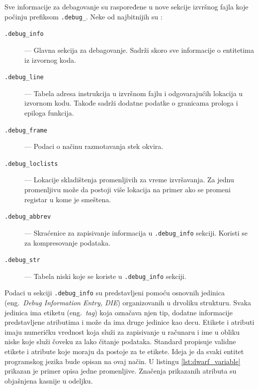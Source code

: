 \documentclass[12pt,oneside]{memoir}
\begin{document}
Sve informacije za debagovanje su raspoređene u nove sekcije izvršnog fajla koje počinju prefiksom \verb|.debug_|.
Neke od najbitnijih su \cite{eager2012introduction_dwarf}:
\begin{description}
  \item[\texttt{.debug\_info}] --- Glavna sekcija za debagovanje. Sadrži skoro sve informacije o entitetima iz izvornog koda.
  \item[\texttt{.debug\_line}] --- Tabela adresa instrukcija u izvršnom fajlu i odgovarajućih lokacija u izvornom kodu. Takođe sadrži dodatne podatke o granicama prologa i epiloga funkcija.
  \item[\texttt{.debug\_frame}] --- Podaci o načinu razmotavanja stek okvira.
  \item[\texttt{.debug\_loclists}] --- Lokacije skladištenja promenljivih za vreme izvršavanja. Za jednu promenljivu može da postoji više lokacija na primer ako se promeni registar u kome je smeštena.
  \item[\texttt{.debug\_abbrev}] --- Skraćenice za zapisivanje informacija u \verb|.debug_info| sekciji. Koristi se za kompresovanje podataka. %
  \item[\texttt{.debug\_str}] --- Tabela niski koje se koriste u \verb|.debug_info| sekciji.
\end{description}

Podaci u sekciji \verb|.debug_info| su predstavljeni pomoću osnovnih jedinica (eng.~{\em Debug Information Entry, DIE}) organizovanih u drvoliku strukturu.
Svaka jedinica ima etiketu (eng.~{\em tag}) koja označava njen tip, dodatne informacije predstavljene atributima i može da ima druge jedinice kao decu.
Etikete i atributi imaju numeričku vrednost koja služi za zapisivanje u računaru i ime u obliku niske koje služi čoveku za lako čitanje podataka.
Standard propisuje validne etikete i atribute koje moraju da postoje za te etikete.
Ideja je da svaki entitet programskog jezika bude opisan na ovaj način.
U listingu \ref{lst:dwarf_variable} prikazan je primer opisa jedne promenljive.
Značenja prikazanih atributa su objašnjena kasnije u odeljku.
\end{document}
